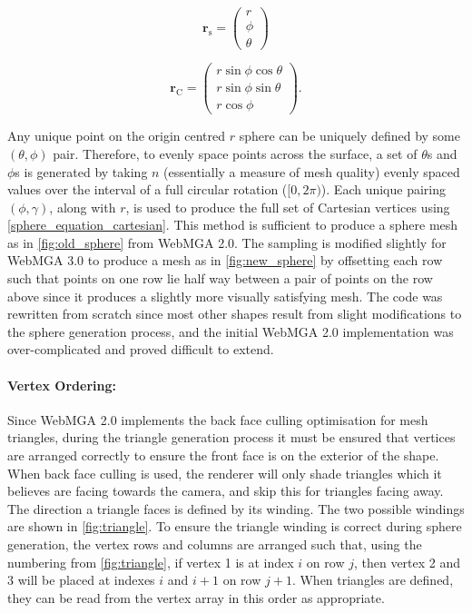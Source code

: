 \begin{equation}
\mathbf{r}_\mathrm{s}=\begin{pmatrix}r\\\phi\\\theta\end{pmatrix}
\label{sphere_equation_spherical}
\end{equation}

\begin{equation}
\mathbf{r}_\mathrm{C}=\begin{pmatrix}r\sin\phi \cos\theta\\
r\sin\phi \sin\theta\\
r\cos\phi\end{pmatrix}.
\label{sphere_equation_cartesian}
\end{equation}

Any unique point on the origin centred $r$ sphere can be uniquely defined by some $(\theta,\phi)$ pair. Therefore, to evenly space points across the surface, a set of $\theta$s and $\phi$s is generated by taking $n$ (essentially a measure of mesh quality) evenly spaced values over the interval of a full circular rotation ($[0, 2\pi)$). Each unique pairing $(\phi,\gamma)$, along with $r$, is used to produce the full set of Cartesian vertices using \cref{sphere_equation_cartesian}. This method is sufficient to produce a sphere mesh as in \cref{fig:old_sphere} from WebMGA 2.0. The sampling is modified slightly for WebMGA 3.0 to produce a mesh as in \cref{fig:new_sphere} by offsetting each row such that points on one row lie half way between a pair of points on the row above since it produces a slightly more visually satisfying mesh. The code was rewritten from scratch since most other shapes result from slight modifications to the sphere generation process, and the initial WebMGA 2.0 implementation was over-complicated and proved difficult to extend.

\paragraph{Vertex Ordering:} Since WebMGA 2.0 implements the back face culling optimisation\cite{face_cull} for mesh triangles, during the triangle generation process it must be ensured that vertices are arranged correctly to ensure the front face is on the exterior of the shape. When back face culling is used, the renderer will only shade triangles which it believes are facing towards the camera, and skip this for triangles facing away. The direction a triangle faces is defined by its winding. The two possible windings are shown in \cref{fig:triangle}. To ensure the triangle winding is correct during sphere generation, the vertex rows and columns are arranged such that, using the numbering from \cref{fig:triangle}, if vertex 1 is at index $i$ on row $j$, then vertex 2 and 3 will be placed at indexes $i$ and $i+1$ on row $j+1$. When triangles are defined, they can be read from the vertex array in this order as appropriate.

